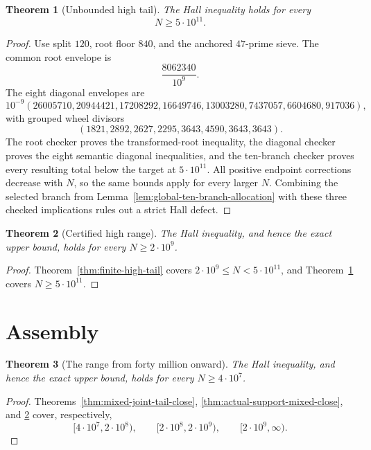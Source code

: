 \documentclass[11pt]{article}
\newtheorem{theorem}{Theorem}[section]
\theoremstyle{definition}
\newcommand{\FortyMillion}{4\cdot10^7}
\newcommand{\TwoHundredMillion}{2\cdot10^8}
\newcommand{\TwoBillion}{2\cdot10^9}
\newcommand{\FiveHundredBillion}{5\cdot10^{11}}
\begin{document}
\begin{theorem}[Unbounded high tail]\label{thm:unbounded-high-tail}
The Hall inequality holds for every
\[
 N\geq\FiveHundredBillion.
\]
\end{theorem}

\begin{proof}
Use split $120$, root floor $840$, and the anchored $47$-prime sieve.  The
common root envelope is
\[
 \frac{8062340}{10^9}.
\]
The eight diagonal envelopes are
\[
 10^{-9}(26005710,20944421,17208292,16649746,
 13003280,7437057,6604680,917036),
\]
with grouped wheel divisors
\[
 (1821,2892,2627,2295,3643,4590,3643,3643).
\]
The root checker proves the transformed-root inequality, the diagonal
checker proves the eight semantic diagonal inequalities, and the
ten-branch checker proves every resulting total below the target at
$\FiveHundredBillion$.  All positive endpoint corrections decrease with
$N$, so the same bounds apply for every larger $N$.  Combining the selected
branch from Lemma~\ref{lem:global-ten-branch-allocation} with these three
checked implications rules out a strict Hall defect.
\end{proof}

\begin{theorem}[Certified high range]\label{thm:formal-high-tail-close}
The Hall inequality, and hence the exact upper bound, holds for every
$N\geq\TwoBillion$.
\end{theorem}

\begin{proof}
Theorem~\ref{thm:finite-high-tail} covers
$\TwoBillion\leq N<\FiveHundredBillion$, and
Theorem~\ref{thm:unbounded-high-tail} covers
$N\geq\FiveHundredBillion$.
\end{proof}

\section{Assembly}

\begin{theorem}[The range from forty million onward]
\label{thm:forty-million-tail-assembly}
The Hall inequality, and hence the exact upper bound, holds for every
$N\geq\FortyMillion$.
\end{theorem}

\begin{proof}
Theorems~\ref{thm:mixed-joint-tail-close},
\ref{thm:actual-support-mixed-close}, and
\ref{thm:formal-high-tail-close} cover, respectively,
\[
 [\FortyMillion,\TwoHundredMillion),\qquad
 [\TwoHundredMillion,\TwoBillion),\qquad
 [\TwoBillion,\infty).
\]
\end{proof}
\end{document}
